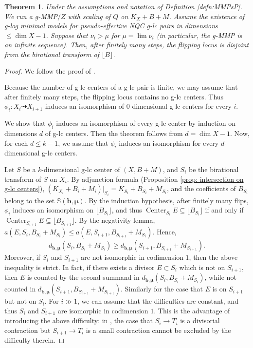 \documentclass[11pt]{amsart}
\newcommand{\Center}{\operatorname{Center}}
\newcommand{\lf}{\lfloor}
\newcommand{\rf}{\rfloor}
\newtheorem{theorem}{Theorem}[section]
\begin{document}
\begin{theorem}\label{prop: special termination 2}
	Under the assumptions and notation of Definition \ref{defn:MMPsP}. We run a g-MMP$/Z$ with scaling of $Q$ on $K_X+B+M$. Assume the existence of g-log minimal models for pseudo-effective NQC g-lc pairs in dimensions $\le \dim X-1$. Suppose that $\nu_i>\mu$ for $\mu=\lim \nu_i$ (in particular, the g-MMP is an infinite sequence). Then, after finitely many steps, the flipping locus is disjoint from the birational transform of $\lf B \rf$. \end{theorem}


\begin{proof}
We follow the proof of \cite[Theorem 4.2.1]{Fujino07}. 
	
Because the number of g-lc centers of a g-lc pair is finite, we may assume that after finitely many steps, the flipping locus contains no g-lc centers. Thus $\phi_i: X_i\dashrightarrow X_{i+1}$ induces an isomorphism of $0$-dimensional g-lc centers for every $i$. 
	
	 We show that $\phi_i$ induces an isomorphism of every g-lc center by induction on dimensions $d$ of g-lc centers. Then the theorem follows from $d=\dim X -1$. Now, for each $d \leq k-1$, we assume that $\phi_i$ induces an isomorphism for every $d $-dimensional g-lc centers.
	
	Let $S$ be a $k$-dimensional g-lc center of $(X,B+M)$, and $S_i$ be the birational transform of $S$ on $X_i$. By adjunction formula (Proposition \ref{prop: intersection on g-lc centers}), $(K_{X_i}+B_i+M_i)|_{S_i}=K_{S_i}+B_{S_i}+M_{S_i}$, and the coefficients of $B_{S_i}$ belong to the set $\mathbb{S}(\bm{b},\bm{\mu})$. By the induction hypothesis, after finitely many flips, $\phi_i$ induces an isomorphism on $\lfloor B_{S_i}\rfloor$, and thus $\Center_{S_i}E\subseteq \lfloor B_{S_i}\rfloor$ if and only if $\Center_{S_{i+1}}E\subseteq \lfloor B_{S_{i+1}}\rfloor$. By the negativity lemma, $a(E,S_i,B_{S_i}+M_{S_i})\le a(E,S_{i+1},B_{S_{i+1}}+M_{S_i})$. Hence, 	
	\[
	d_{\bm{b},\bm{\mu}}(S_i,B_{S_i}+M_{S_i})\ge d_{\bm{b},\bm{\mu}}(S_{i+1},B_{S_{i+1}}+M_{S_{i+1}}).
	\] Moreover, if $S_i$ and $S_{i+1}$ are not isomorphic in codimension $1$, then the above inequality is strict. In fact, if there exists a divisor $E \subset S_i$ which is not on $S_{i+1}$, then $E$ is counted by the second summand in $d_{\bm{b},\bm{\mu}}(S_i,B_{S_i}+M_{S_i})$, while not counted in $d_{\bm{b},\bm{\mu}}(S_{i+1},B_{S_{i+1}}+M_{S_{i+1}})$. Similarly for the case that $E$ is on $S_{i+1}$ but not on $S_i$. For $i\gg 1$, we can assume that the difficulties are constant, and thus $S_i$ and $S_{i+1}$ are isomorphic in codimension $1$. This is the advantage of introducing the above difficulty: in \cite[Proposition 4.2.14]{Fujino07}, the case that $S_i \to T_i$ is a divisorial contraction but $S_{i+1} \to T_i$ is a small contraction cannot be excluded by the difficulty therein.


\end{proof}
\end{document}
